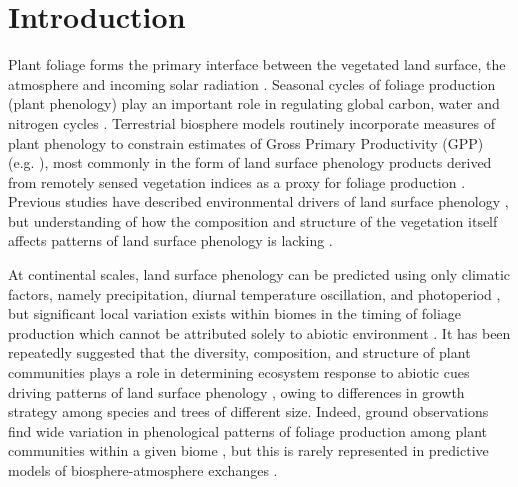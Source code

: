 \documentclass[11pt,a4paper]{article}
\begin{document}
\newpage{}

\section{Introduction}

Plant foliage forms the primary interface between the vegetated land surface, the atmosphere and incoming solar radiation \citep{Gu2003, Penuelas2009}. Seasonal cycles of foliage production (plant phenology) play an important role in regulating global carbon, water and nitrogen cycles \citep{Richardson2013}. Terrestrial biosphere models routinely incorporate measures of plant phenology to constrain estimates of Gross Primary Productivity (GPP) (e.g. \citealt{Bloom2016}), most commonly in the form of land surface phenology products derived from remotely sensed vegetation indices as a proxy for foliage production \citep{Helman2018}. Previous studies have described environmental drivers of land surface phenology \citep{Adole2019, Guan2014}, but understanding of how the composition and structure of the vegetation itself affects patterns of land surface phenology is lacking \citep{Whitley2017}. 

At continental scales, land surface phenology can be predicted using only climatic factors, namely precipitation, diurnal temperature oscillation, and photoperiod \citep{Adole2018a, Adole2019, Guan2014}, but significant local variation exists within biomes in the timing of foliage production which cannot be attributed solely to abiotic environment \citep{Stockli2011}. It has been repeatedly suggested that the diversity, composition, and structure of plant communities plays a role in determining ecosystem response to abiotic cues driving patterns of land surface phenology \citep{Adole2018b, Jeganathan2014, Fuller1999}, owing to differences in growth strategy among species and trees of different size. Indeed, ground observations find wide variation in phenological patterns of foliage production among plant communities within a given biome \citep{Seyednasrollah2019}, but this is rarely represented in predictive models of biosphere-atmosphere exchanges \citep{Scheiter2013, Pavlick2013}.
\end{document}
